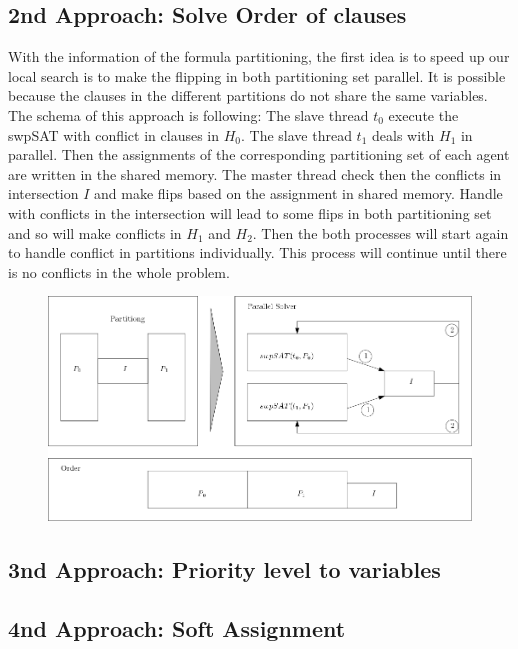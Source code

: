 \documentclass[12pt,a4paper,twoside]{scrartcl}
\numberwithin{equation}{section}
\begin{document}
\subsection{2nd Approach: Solve Order of clauses}
With the information of the formula partitioning, the first idea is to speed up our local search is to make the flipping in both partitioning set parallel. It is possible because the clauses in the different partitions do not share the same variables. The schema of this approach is following: The slave thread $t_0$ execute the swpSAT with  conflict in clauses in $H_0$. The slave thread $t_1$ deals with $H_1$ in parallel.  Then the assignments of the corresponding partitioning set of each agent are written in the shared memory. The master thread check then the conflicts in intersection $I$ and make flips based on the assignment in shared memory.  Handle with conflicts in the intersection will lead to some flips in both partitioning set and so will make conflicts in $H_1$ and $H_2$. Then the both processes will start again to handle conflict in partitions individually. This process will continue until there is no conflicts in the whole problem.
\begin{figure}[H]
\begin{center}
  \includegraphics[scale = 0.3]{1/a2.png}
  \end{center}
  \caption{}
  \label{Experiment 1 k3 cactus plot}
  \end{figure}


\subsection{3nd Approach: Priority level to variables}
\subsection{4nd Approach: Soft Assignment}
\end{document}
